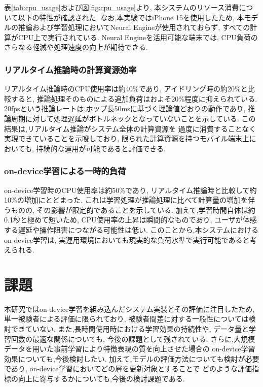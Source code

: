 表\ref{tab:cpu_usage}および図\ref{fig:cpu_usage}より,
本システムのリソース消費について以下の特性が確認された.
なお,本実験ではiPhone 15を使用したため,
本モデルの推論および学習処理においてNeural Engineが使用されておらず,
すべての計算がCPU上で実行されている.
Neural Engineを活用可能な端末では,
CPU負荷のさらなる軽減や処理速度の向上が期待できる.

\subsubsection{リアルタイム推論時の計算資源効率}
リアルタイム推論時のCPU使用率は約40\%であり,
アイドリング時の約20\%と比較すると,
推論処理そのものによる追加負荷はおよそ20\%程度に抑えられている.
20fpsという推論レートは,ホップ長50msに基づく理論値どおりの動作であり,
推論周期に対して処理遅延がボトルネックとなっていないことを示している.
この結果は,リアルタイム推論がシステム全体の計算資源を
過度に消費することなく実現できていることを示唆しており,
限られた計算資源を持つモバイル端末上においても,
持続的な運用が可能であると評価できる.

\subsubsection{on-device学習による一時的負荷}
on-device学習時のCPU使用率は約50\%であり,
リアルタイム推論時と比較して約10\%の増加にとどまった.
これは学習処理が推論処理に比べて計算量の増加を伴うものの,
その影響が限定的であることを示している.
加えて,学習時間自体は約0.1秒と極めて短いため,
CPU使用率の上昇は瞬間的なものであり,
ユーザが体感する遅延や操作阻害につながる可能性は低い.
このことから,本システムにおけるon-device学習は,
実運用環境においても現実的な負荷水準で実行可能であると考えられる.

\section{課題}

本研究ではon-device学習を組み込んだシステム実装とその評価に注目したため,
単一被験者による評価に限られており,
被験者間差に対する一般性については検討できていない.
また,長時間使用時における学習効果の持続性や,
データ量と学習回数の最適な関係についても,
今後の課題として残されている.
さらに,大規模データを用いた事前学習により特徴表現の質を向上させた場合の
on-device学習効果についても,今後検討したい.
加えて,モデルの評価方法についても検討が必要であり,
on-device学習においてどの層を更新対象とすることで
どのような評価指標の向上に寄与するかについても,今後の検討課題である.


